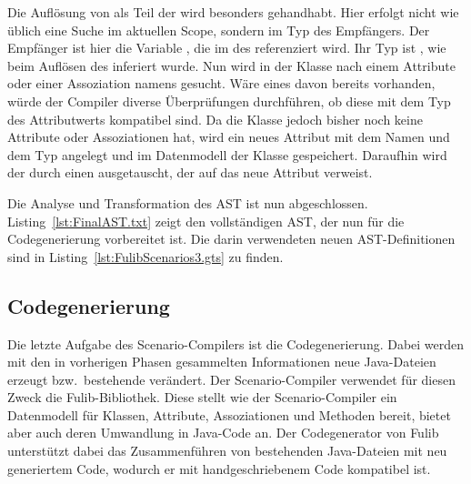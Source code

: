 Die Auflösung von  als Teil der  wird besonders gehandhabt.
Hier erfolgt nicht wie üblich eine Suche im aktuellen Scope, sondern im Typ des Empfängers.
Der Empfänger ist hier die Variable , die im  des  referenziert wird.
Ihr Typ ist , wie beim Auflösen des  inferiert wurde.
Nun wird in der Klasse  nach einem Attribute oder einer Assoziation namens  gesucht.
Wäre eines davon bereits vorhanden, würde der Compiler diverse Überprüfungen durchführen,
ob diese mit dem Typ des Attributwerts kompatibel sind.
Da die Klasse  jedoch bisher noch keine Attribute oder Assoziationen hat,
wird ein neues Attribut mit dem Namen  und dem Typ  angelegt
und im Datenmodell der Klasse  gespeichert.
Daraufhin wird der  durch einen  ausgetauscht,
der auf das neue Attribut verweist.

Die Analyse und Transformation des AST ist nun abgeschlossen.
Listing~\ref{lst:FinalAST.txt} zeigt den vollständigen AST, der nun für die Codegenerierung vorbereitet ist.
Die darin verwendeten neuen AST-Definitionen sind in Listing~\ref{lst:FulibScenarios3.gts} zu finden.



\subsection{Codegenerierung}\label{subsec:codegen-fulib}

Die letzte Aufgabe des Scenario-Compilers ist die Codegenerierung.
Dabei werden mit den in vorherigen Phasen gesammelten Informationen neue Java-Dateien erzeugt bzw.\ bestehende verändert.
Der Scenario-Compiler verwendet für diesen Zweck die Fulib\cite{fulib}-Bibliothek.
Diese stellt wie der Scenario-Compiler ein Datenmodell für Klassen, Attribute, Assoziationen und Methoden bereit,
bietet aber auch deren Umwandlung in Java-Code an.
Der Codegenerator von Fulib unterstützt dabei das Zusammenführen von bestehenden Java-Dateien mit neu generiertem Code,
wodurch er mit handgeschriebenem Code kompatibel ist.

